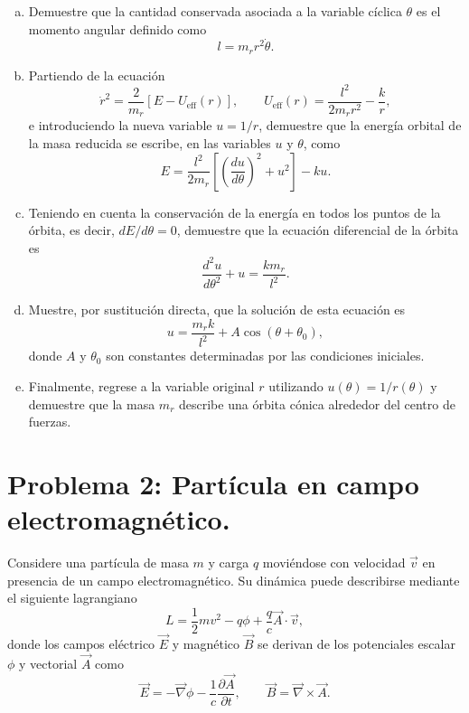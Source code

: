 \documentclass[a4paper]{article}
\begin{document}
\begin{enumerate}[a)]
    \item Demuestre que la cantidad conservada asociada a la variable cíclica $\theta$ es el momento angular definido como
    $$l = m_r r^2 \dot{\theta}.$$
    
    \item Partiendo de la ecuación
    $$\dot{r}^2 = \frac{2}{m_r} \left[E - U_{\text{eff}}(r)\right], \qquad U_{\text{eff}}(r) = \frac{l^2}{2m_r r^2} - \frac{k}{r},$$
    e introduciendo la nueva variable $u = 1/r$, demuestre que la energía orbital de la masa reducida se escribe, en las variables $u$ y $\theta$, como
    $$E = \frac{l^2}{2m_r} \left[ \left(\frac{du}{d\theta}\right)^2 + u^2 \right] - ku.$$
    
    \item Teniendo en cuenta la conservación de la energía en todos los puntos de la órbita, es decir, $dE/d\theta = 0$, demuestre que la ecuación diferencial de la órbita es
    $$\frac{d^2u}{d\theta^2} + u = \frac{km_r}{l^2}.$$
    
    \item Muestre, por sustitución directa, que la solución de esta ecuación es
    $$u = \frac{m_r k}{l^2} + A\cos(\theta + \theta_0),$$
    donde $A$ y $\theta_0$ son constantes determinadas por las condiciones iniciales.
    
    \item Finalmente, regrese a la variable original $r$ utilizando $u(\theta) = 1/r(\theta)$ y demuestre que la masa $m_r$ describe una órbita cónica alrededor del centro de fuerzas.
\end{enumerate}


\section{Problema 2: Partícula en campo electromagnético.}

Considere una partícula de masa $m$ y carga $q$ moviéndose con velocidad $\vec{v}$ en presencia de un campo electromagnético. Su dinámica puede describirse mediante el siguiente lagrangiano
$$L = \frac{1}{2}mv^2 - q\phi + \frac{q}{c}\vec{A} \cdot \vec{v},$$
donde los campos eléctrico $\vec{E}$ y magnético $\vec{B}$ se derivan de los potenciales escalar $\phi$ y vectorial $\vec{A}$ como
$$\vec{E} = -\vec{\nabla}\phi - \frac{1}{c}\frac{\partial \vec{A}}{\partial t}, \qquad \vec{B} = \vec{\nabla} \times \vec{A}.$$
\end{document}
